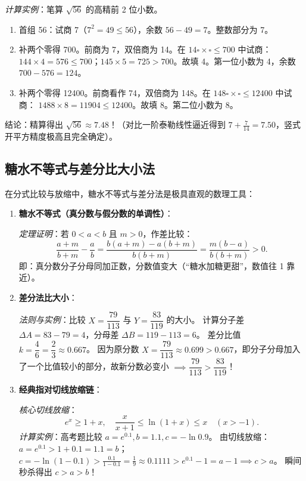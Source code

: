 \documentclass[12pt,a4paper]{ctexart}
\begin{document}
\begin{enumerate}[label=\arabic*. , leftmargin=2em, itemsep=1.2em, topsep=0.2em]
  \textit{计算实例}：笔算 \(\sqrt{56}\) 的高精前 2 位小数。
  \begin{enumerate}[label=(\roman*)]
    \item 首组 56：试商 7（\(7^2 = 49 \leqslant 56\)），余数 \(56 - 49 = 7\)。整数部分为 7。
    \item 补两个零得 700。前商为 7，双倍商为 14。在 \(14\square \times \square \leqslant 700\) 中试商：
    \(144 \times 4 = 576 \leqslant 700\)；\(145 \times 5 = 725 > 700\)。故填 4。第一位小数为 4，余数 \(700 - 576 = 124\)。
    \item 补两个零得 12400。前商看作 74，双倍商为 148。在 \(148\square \times \square \leqslant 12400\) 中试商：
    \(1488 \times 8 = 11904 \leqslant 12400\)。故填 8。第二位小数为 8。
  \end{enumerate}
  结论：精算得出 \(\sqrt{56} \approx 7.48\)！（对比一阶泰勒线性逼近得到 \(7 + \frac{7}{14} = 7.50\)，竖式开平方精度极高且完全确定）。
\end{enumerate}

\subsection{糖水不等式与差分比大小法}
在分式比较与放缩中，糖水不等式与差分法是极具直观的数理工具：

\begin{enumerate}[label=\arabic*. , leftmargin=2em, itemsep=1.2em, topsep=0.2em]
  \item \textbf{糖水不等式（真分数与假分数的单调性）}：
  
  \textit{定理证明}：若 \(0 < a < b\) 且 \(m > 0\)，作差比较：
  \[
  \frac{a+m}{b+m} - \frac{a}{b} = \frac{b(a+m) - a(b+m)}{b(b+m)} = \frac{m(b-a)}{b(b+m)} > 0.
  \]
  即：真分数分子分母同加正数，分数值变大（“糖水加糖更甜”，数值往 1 靠近）。
  
  \item \textbf{差分法比大小}：
  
  \textit{法则与实例}：比较 \(X = \dfrac{79}{113}\) 与 \(Y = \dfrac{83}{119}\) 的大小。
  计算分子差 \(\Delta A = 83 - 79 = 4\)，分母差 \(\Delta B = 119 - 113 = 6\)。
  差分比值 \(k = \dfrac{4}{6} = \dfrac{2}{3} \approx 0.667\)。
  因为原分数 \(X = \dfrac{79}{113} \approx 0.699 > 0.667\)，即分子分母加入了一个比值较小的部分，故新分数必变小 \(\implies \dfrac{79}{113} > \dfrac{83}{119}\)！

  \item \textbf{经典指对切线放缩链}：
  
  \textit{核心切线放缩}：
  \[
  e^x \geqslant 1 + x,\quad \frac{x}{x+1} \leqslant \ln(1+x) \leqslant x \quad (x > -1).
  \]
  \textit{计算实例}：高考题比较 \(a = e^{0.1}, b = 1.1, c = -\ln 0.9\)。
  由切线放缩：\(a = e^{0.1} > 1 + 0.1 = 1.1 = b\)；
  \(c = -\ln(1 - 0.1) > \frac{0.1}{1-0.1} = \frac{1}{9} \approx 0.1111 > e^{0.1} - 1 = a - 1 \implies c > a\)。
  瞬间秒杀得出 \(c > a > b\)！
\end{enumerate}
\end{document}
